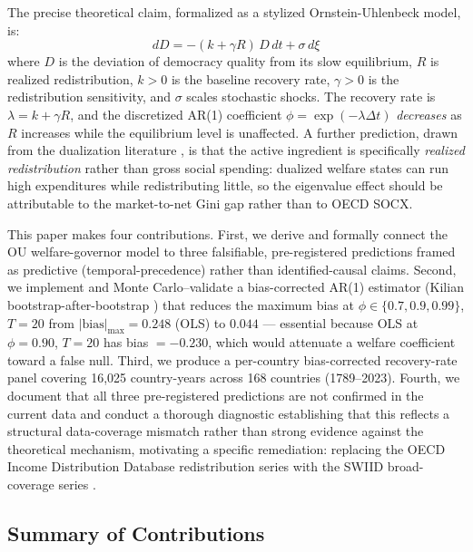 \documentclass[11pt,letterpaper]{article}
\begin{document}
The precise theoretical claim, formalized as a stylized Ornstein-Uhlenbeck model, is:
\begin{equation}
  dD = -(k + \gamma R)\,D\,dt + \sigma\,d\xi
  \label{eq:ou}
\end{equation}
where $D$ is the deviation of democracy quality from its slow equilibrium, $R$ is realized redistribution, $k > 0$ is
the baseline recovery rate, $\gamma > 0$ is the redistribution sensitivity, and $\sigma$ scales stochastic shocks. The
recovery rate is $\lambda = k + \gamma R$, and the discretized AR(1) coefficient $\phi = \exp(-\lambda \Delta t)$
\emph{decreases} as $R$ increases while the equilibrium level is unaffected. A further prediction, drawn from the
dualization literature \citep{Lindvall2014,Emmenegger2012}, is that the active ingredient is specifically
\emph{realized redistribution} rather than gross social spending: dualized welfare states can run high expenditures while
redistributing little, so the eigenvalue effect should be attributable to the market-to-net Gini gap rather than to OECD
SOCX.

This paper makes four contributions. First, we derive and formally connect the OU welfare-governor model to three
falsifiable, pre-registered predictions framed as predictive (temporal-precedence) rather than identified-causal claims.
Second, we implement and Monte Carlo--validate a bias-corrected AR(1) estimator (Kilian bootstrap-after-bootstrap
\citep{Kilian1998}) that reduces the maximum bias at $\phi \in \{0.7, 0.9, 0.99\}$, $T = 20$ from
$|\text{bias}|_\text{max} = 0.248$ (OLS) to $0.044$ --- essential because OLS at $\phi = 0.90$, $T = 20$ has
bias $= -0.230$, which would attenuate a welfare coefficient toward a false null. Third, we produce a per-country
bias-corrected recovery-rate panel covering 16,025 country-years across 168 countries (1789--2023). Fourth, we document
that all three pre-registered predictions are not confirmed in the current data and conduct a thorough diagnostic
establishing that this reflects a structural data-coverage mismatch rather than strong evidence against the theoretical
mechanism, motivating a specific remediation: replacing the OECD Income Distribution Database redistribution series with
the SWIID broad-coverage series \citep{Solt2019}.

\subsection*{Summary of Contributions}
\end{document}
